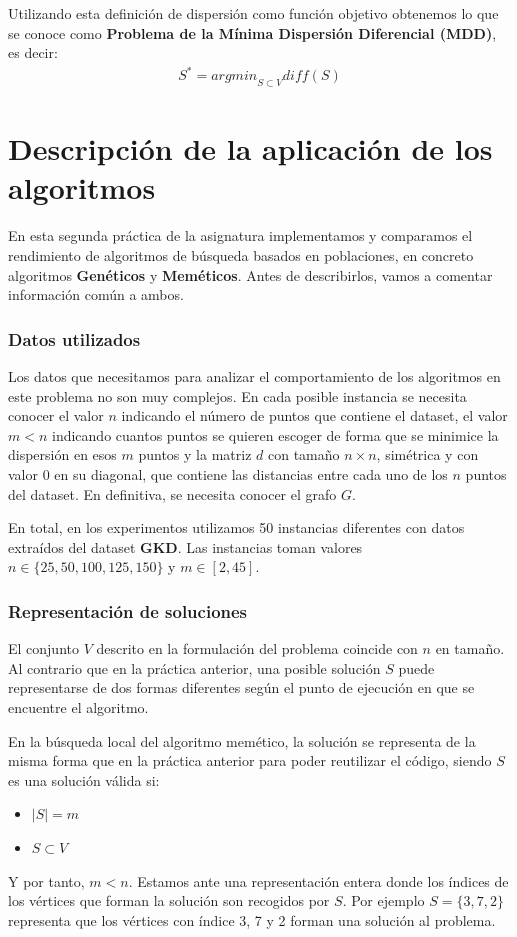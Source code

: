 Utilizando esta definición de dispersión como función objetivo obtenemos lo que se conoce como \textbf{Problema de la Mínima Dispersión Diferencial (MDD)}, es decir: 
\begin{align*}
    S^{*} = {arg min}_{S \subset V} diff(S)
\end{align*}


\part{Descripción de la aplicación de los algoritmos}
En esta segunda práctica de la asignatura implementamos y comparamos el rendimiento de algoritmos de búsqueda basados en poblaciones, en concreto algoritmos \textbf{Genéticos} y \textbf{Meméticos}. Antes de describirlos, vamos a comentar información común a ambos.


\section{Datos utilizados}
Los datos que necesitamos para analizar el comportamiento de los algoritmos en este problema no son muy complejos. En cada posible instancia se necesita conocer el valor $n$ indicando el número de puntos que contiene el dataset, el valor $m < n$ indicando cuantos puntos se quieren escoger de forma que se minimice la dispersión en esos $m$ puntos y la matriz $d$ con tamaño $n \times n$, simétrica y con valor 0 en su diagonal, que contiene las distancias entre cada uno de los $n$ puntos del dataset. En definitiva, se necesita conocer el grafo $G$.

En total, en los experimentos utilizamos 50 instancias diferentes con datos extraídos del dataset \textbf{GKD}. Las instancias toman valores $n \in \{25,50,100,125,150\}$ y $m \in [2,45]$.

\section{Representación de soluciones}

El conjunto $V$ descrito en la formulación del problema coincide con $n$ en tamaño. Al contrario que en la práctica anterior, una posible solución $S$ puede representarse de dos formas diferentes según el punto de ejecución en que se encuentre el algoritmo.

En la búsqueda local del algoritmo memético, la solución se representa de la misma forma que en la práctica anterior para poder reutilizar el código, siendo $S$ es una solución válida si:
\begin{itemize}
    \item $|S| = m$
    \item $S \subset V$
\end{itemize}
Y por tanto, $m < n$. Estamos ante una representación entera donde los índices de los vértices que forman la solución son recogidos por $S$. Por ejemplo $S = \{3,7,2\}$ representa que los vértices con índice 3, 7 y 2 forman una solución al problema.

